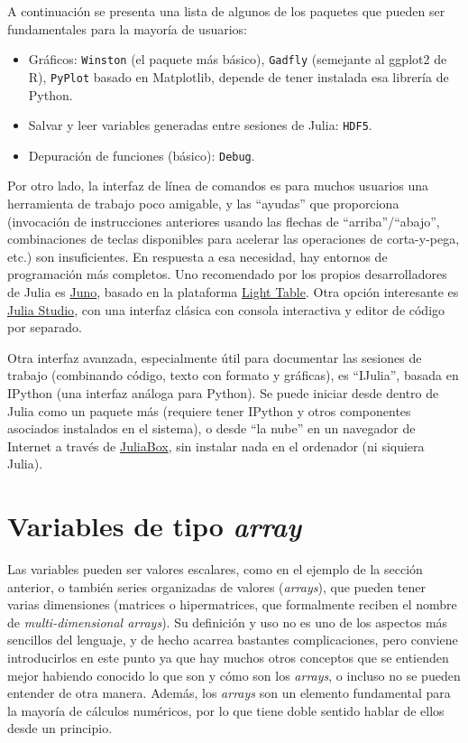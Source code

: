 ﻿\documentclass[spanish]{article}
\begin{document}
A continuación se presenta una lista de algunos de los paquetes que
pueden ser fundamentales para la mayoría de usuarios:
\begin{itemize}
\item Gráficos: \texttt{Winston} (el paquete más básico), \texttt{Gadfly}
(semejante al ggplot2 de R), \texttt{PyPlot} basado en Matplotlib,
depende de tener instalada esa librería de Python.
\item Salvar y leer variables generadas entre sesiones de Julia: \texttt{HDF5}.
\item Depuración de funciones (básico): \texttt{Debug}.
\end{itemize}
Por otro lado, la interfaz de línea de comandos es para muchos usuarios
una herramienta de trabajo poco amigable, y las ``ayudas'' que proporciona
(invocación de instrucciones anteriores usando las flechas de ``arriba''/``abajo'',
combinaciones de teclas disponibles para acelerar las operaciones
de corta-y-pega, etc.) son insuficientes. En respuesta a esa necesidad,
hay entornos de programación más completos. Uno recomendado por los propios
desarrolladores de Julia es \href{http://junolab.org/}{Juno}, basado en
la plataforma \href{http://lighttable.com/}{Light Table}. Otra opción
interesante es \href{http://forio.com/products/julia-studio/}{Julia Studio},
con una interfaz clásica con consola interactiva y editor de código por separado.

Otra interfaz avanzada, especialmente útil para documentar las sesiones
de trabajo (combinando código, texto con formato y gráficas), es ``IJulia'',
basada en IPython (una interfaz análoga para Python). Se puede iniciar desde
dentro de Julia como un paquete más (requiere tener IPython y otros componentes
asociados instalados en el sistema), o desde ``la nube'' en un navegador de
Internet a través de \href{https://www.juliabox.org/}{JuliaBox}, sin
instalar nada en el ordenador (ni siquiera Julia).


\section{Variables de tipo \emph{array}}

Las variables pueden ser valores escalares, como en el ejemplo de
la sección anterior, o también series organizadas de valores (\emph{arrays}),
que pueden tener varias dimensiones (matrices o hipermatrices, que
formalmente reciben el nombre de \emph{multi-dimensional arrays}).
Su definición y uso no es uno de los aspectos más sencillos del lenguaje,
y de hecho acarrea bastantes complicaciones, pero conviene introducirlos
en este punto ya que hay muchos otros conceptos que se entienden mejor
habiendo conocido lo que son y cómo son los \emph{arrays}, o incluso
no se pueden entender de otra manera. Además, los \emph{arrays} son
un elemento fundamental para la mayoría de cálculos numéricos, por
lo que tiene doble sentido hablar de ellos desde un principio.
\end{document}
